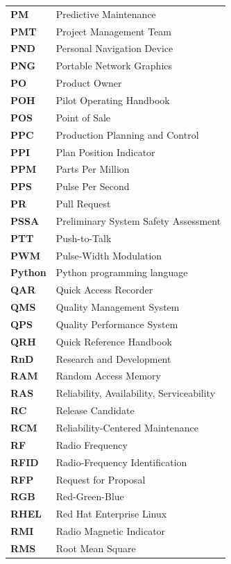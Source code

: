 \begin{longtable}{p{3cm}p{11cm}}
\textbf{PM} & Predictive Maintenance \\
\textbf{PMT} & Project Management Team \\
\textbf{PND} & Personal Navigation Device \\
\textbf{PNG} & Portable Network Graphics \\
\textbf{PO} & Product Owner \\
\textbf{POH} & Pilot Operating Handbook \\
\textbf{POS} & Point of Sale \\
\textbf{PPC} & Production Planning and Control \\
\textbf{PPI} & Plan Position Indicator \\
\textbf{PPM} & Parts Per Million \\
\textbf{PPS} & Pulse Per Second \\
\textbf{PR} & Pull Request \\
\textbf{PSSA} & Preliminary System Safety Assessment \\
\textbf{PTT} & Push-to-Talk \\
\textbf{PWM} & Pulse-Width Modulation \\
\textbf{Python} & Python programming language \\
\textbf{QAR} & Quick Access Recorder \\
\textbf{QMS} & Quality Management System \\
\textbf{QPS} & Quality Performance System \\
\textbf{QRH} & Quick Reference Handbook \\
\textbf{RnD} & Research and Development \\
\textbf{RAM} & Random Access Memory \\
\textbf{RAS} & Reliability, Availability, Serviceability \\
\textbf{RC} & Release Candidate \\
\textbf{RCM} & Reliability-Centered Maintenance \\
\textbf{RF} & Radio Frequency \\
\textbf{RFID} & Radio-Frequency Identification \\
\textbf{RFP} & Request for Proposal \\
\textbf{RGB} & Red-Green-Blue \\
\textbf{RHEL} & Red Hat Enterprise Linux \\
\textbf{RMI} & Radio Magnetic Indicator \\
\textbf{RMS} & Root Mean Square \\

\end{longtable}
